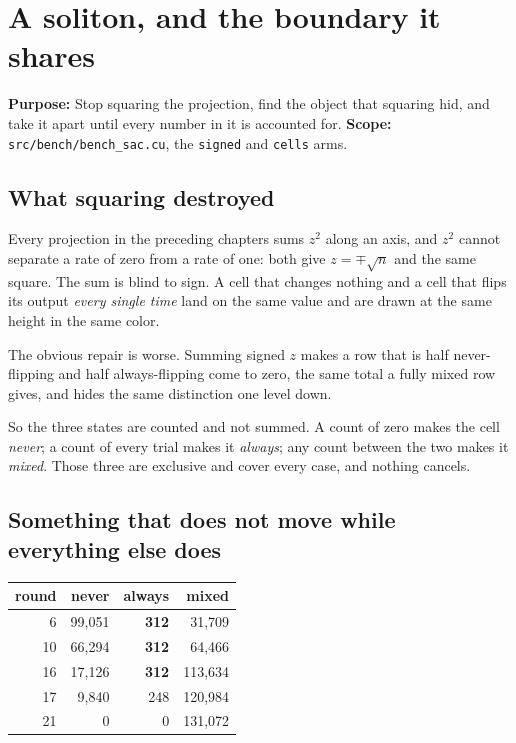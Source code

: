 \chapter{A soliton, and the boundary it shares}

\textbf{Purpose:} Stop squaring the projection, find the object that squaring hid, and take it apart
until every number in it is accounted for. \textbf{Scope:}
\texttt{src/\allowbreak{}bench/\allowbreak{}bench\_\allowbreak{}sac.\allowbreak{}cu}, the
\texttt{signed} and \texttt{cells} arms.

\section{What squaring destroyed}

Every projection in the preceding chapters sums \(z^{2}\) along an axis, and \(z^{2}\) cannot
separate a rate of zero from a rate of one: both give \(z = \mp\sqrt{n}\) and the same square. The
sum is blind to sign. A cell that changes nothing and a cell that flips its output \emph{every
single time} land on the same value and are drawn at the same height in the same color.

The obvious repair is worse. Summing signed \(z\) makes a row that is half never-flipping and half
always-flipping come to zero, the same total a fully mixed row gives, and hides the same
distinction one level down.

So the three states are counted and not summed. A count of zero makes the cell \emph{never}; a
count of every trial makes it \emph{always}; any count between the two makes it \emph{mixed}. Those
three are exclusive and cover every case, and nothing cancels.

\section{Something that does not move while everything else does}

\begin{center}
\begin{tabular}{rrrr}
\toprule
round & never & always & mixed \\
\midrule
6 & 99{,}051 & \textbf{312} & 31{,}709 \\
10 & 66{,}294 & \textbf{312} & 64{,}466 \\
16 & 17{,}126 & \textbf{312} & 113{,}634 \\
17 & 9{,}840 & 248 & 120{,}984 \\
21 & 0 & 0 & 131{,}072 \\
\bottomrule
\end{tabular}
\end{center}

